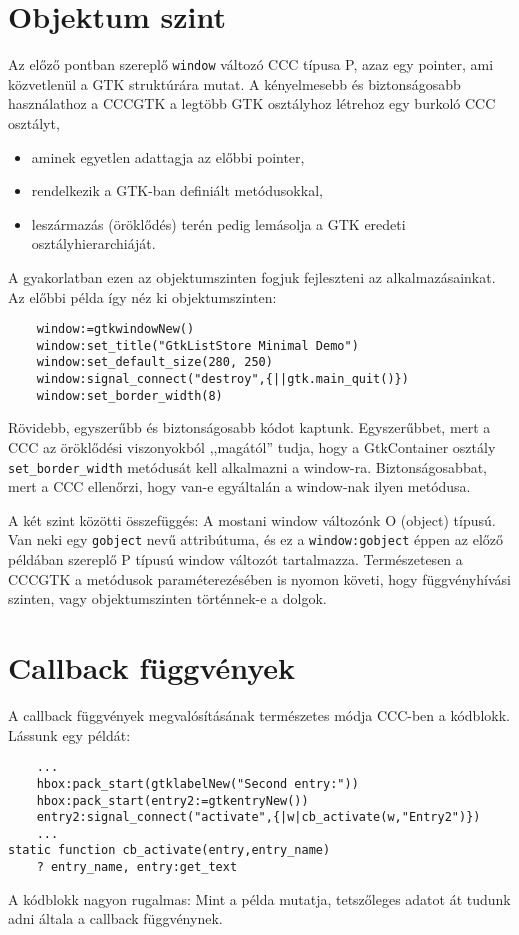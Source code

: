 \section{Objektum szint}

Az előző pontban szereplő \verb!window! változó CCC típusa P, 
azaz egy pointer, ami közvetlenül a GTK struktúrára mutat.
A kényelmesebb és biztonságosabb használathoz a CCCGTK
a legtöbb GTK osztályhoz létrehoz egy burkoló CCC osztályt,
\begin{itemize}
\item aminek egyetlen adattagja az előbbi pointer,
\item rendelkezik a GTK-ban definiált metódusokkal,
\item leszármazás (öröklődés) terén pedig lemásolja
      a GTK eredeti osztályhierarchiáját.
\end{itemize}
A gyakorlatban ezen az objektumszinten fogjuk 
fejleszteni az alkalmazásainkat. Az előbbi példa
így néz ki objektumszinten:
\begin{verbatim}
    window:=gtkwindowNew()
    window:set_title("GtkListStore Minimal Demo")
    window:set_default_size(280, 250)
    window:signal_connect("destroy",{||gtk.main_quit()})
    window:set_border_width(8)
\end{verbatim}
Rövidebb, egyszerűbb és biztonságosabb kódot kaptunk.
Egyszerűbbet, mert a CCC az öröklődési viszonyokból ,,magától'' tudja,
hogy a GtkContainer osztály \verb!set_border_width! metódusát
kell alkalmazni a window-ra. Biztonságosabbat,
mert a CCC ellenőrzi, hogy van-e egyáltalán a window-nak ilyen
metódusa.

A két szint közötti összefüggés:
A mostani window változónk O (object) típusú.
Van neki egy \verb!gobject! nevű attribútuma,
és ez a \verb!window:gobject! éppen az előző példában
szereplő P típusú window változót tartalmazza. 
Természetesen a CCCGTK a metódusok paraméterezésében
is nyomon követi, hogy függvényhívási szinten, 
vagy objektumszinten történnek-e a dolgok.


\section{Callback függvények}

A callback függvények megvalósításának természetes módja
CCC-ben a kódblokk. Lássunk egy példát:

\begin{verbatim}
    ...
    hbox:pack_start(gtklabelNew("Second entry:"))
    hbox:pack_start(entry2:=gtkentryNew())
    entry2:signal_connect("activate",{|w|cb_activate(w,"Entry2")})
    ...
static function cb_activate(entry,entry_name)
    ? entry_name, entry:get_text
\end{verbatim}
A kódblokk nagyon rugalmas:
Mint a példa mutatja, tetszőleges adatot át tudunk adni 
általa a callback függvénynek.


